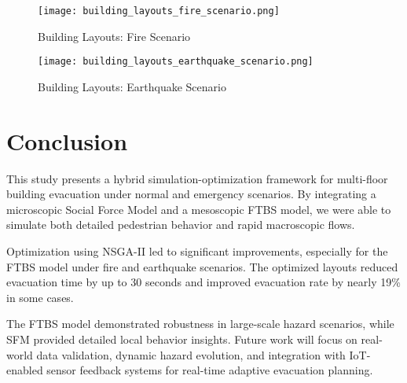 \documentclass[11pt,a4paper]{article}
\begin{document}
\begin{figure}[htbp]
\centering
\texttt{[image: building\_layouts\_fire\_scenario.png]}
\caption{Building Layouts: Fire Scenario}
\label{fig:layout_fire}
\end{figure}

\begin{figure}[htbp]
\centering
\texttt{[image: building\_layouts\_earthquake\_scenario.png]}
\caption{Building Layouts: Earthquake Scenario}
\label{fig:layout_earthquake}
\end{figure}

\section{Conclusion}

This study presents a hybrid simulation-optimization framework for multi-floor building evacuation under normal and emergency scenarios. By integrating a microscopic Social Force Model and a mesoscopic FTBS model, we were able to simulate both detailed pedestrian behavior and rapid macroscopic flows.

Optimization using NSGA-II led to significant improvements, especially for the FTBS model under fire and earthquake scenarios. The optimized layouts reduced evacuation time by up to 30 seconds and improved evacuation rate by nearly 19\% in some cases.

The FTBS model demonstrated robustness in large-scale hazard scenarios, while SFM provided detailed local behavior insights. Future work will focus on real-world data validation, dynamic hazard evolution, and integration with IoT-enabled sensor feedback systems for real-time adaptive evacuation planning.
\end{document}

